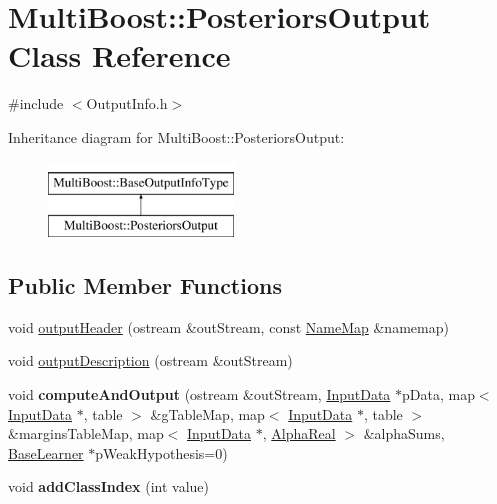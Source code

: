 \hypertarget{classMultiBoost_1_1PosteriorsOutput}{\section{Multi\-Boost\-:\-:Posteriors\-Output Class Reference}
\label{classMultiBoost_1_1PosteriorsOutput}
}


{\ttfamily \#include $<$Output\-Info.\-h$>$}

Inheritance diagram for Multi\-Boost\-:\-:Posteriors\-Output\-:\begin{figure}[H]
\begin{center}
\leavevmode
\includegraphics[height=2.000000cm]{classMultiBoost_1_1PosteriorsOutput}
\end{center}
\end{figure}
\subsection*{Public Member Functions}
\begin{DoxyCompactItemize}
\item 
void \hyperlink{classMultiBoost_1_1PosteriorsOutput_a5ee6d5fdf51f7fb3fbe4dc4ef2e7d6de}{output\-Header} (ostream \&out\-Stream, const \hyperlink{classMultiBoost_1_1NameMap}{Name\-Map} \&namemap)
\item 
void \hyperlink{classMultiBoost_1_1PosteriorsOutput_a024bc0a2baf3baddb5d62b19e677d875}{output\-Description} (ostream \&out\-Stream)
\item 
\hypertarget{classMultiBoost_1_1PosteriorsOutput_ab66a95e5b1ac0e6a5f64488a11b1e63c}{void {\bfseries compute\-And\-Output} (ostream \&out\-Stream, \hyperlink{classMultiBoost_1_1InputData}{Input\-Data} $\ast$p\-Data, map$<$ \hyperlink{classMultiBoost_1_1InputData}{Input\-Data} $\ast$, table $>$ \&g\-Table\-Map, map$<$ \hyperlink{classMultiBoost_1_1InputData}{Input\-Data} $\ast$, table $>$ \&margins\-Table\-Map, map$<$ \hyperlink{classMultiBoost_1_1InputData}{Input\-Data} $\ast$, \hyperlink{Defaults_8h_a80184c4fd10ab70a1a17c5f97dcd1563}{Alpha\-Real} $>$ \&alpha\-Sums, \hyperlink{classMultiBoost_1_1BaseLearner}{Base\-Learner} $\ast$p\-Weak\-Hypothesis=0)}\label{classMultiBoost_1_1PosteriorsOutput_ab66a95e5b1ac0e6a5f64488a11b1e63c}

\item 
\hypertarget{classMultiBoost_1_1PosteriorsOutput_a043d18471cb0acc25868dbe3e11038f4}{void {\bfseries add\-Class\-Index} (int value)}\label{classMultiBoost_1_1PosteriorsOutput_a043d18471cb0acc25868dbe3e11038f4}

\end{DoxyCompactItemize}
